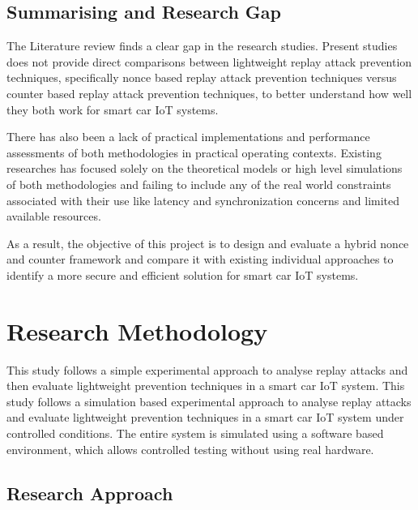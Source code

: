 \documentclass[a4paper,man,12pt]{article}
\begin{document}
\subsection{Summarising and Research Gap}

The Literature review finds a clear gap in the research studies. Present studies does not provide direct comparisons between lightweight replay attack prevention techniques, specifically nonce based replay attack prevention techniques versus counter based replay attack prevention techniques, to better understand how well they both work for smart car IoT systems.\bigbreak

There has also been a lack of practical implementations and performance assessments of both methodologies in practical operating contexts. Existing researches has focused solely on the theoretical models or high level simulations of both methodologies and failing to include any of the real world constraints associated with their use like latency and synchronization concerns and limited available resources.\bigbreak 

As a result, the objective of this project is to design and evaluate a hybrid nonce and counter framework and compare it with existing individual approaches to identify a more secure and efficient solution for smart car IoT systems.


\pagebreak
\section{Research Methodology}
\label{Methodology}

 This study follows a simple experimental approach to analyse replay attacks and then evaluate lightweight prevention techniques in a smart car IoT system. This study follows a simulation based experimental approach to analyse replay attacks and evaluate lightweight prevention techniques in a smart car IoT system under controlled conditions. The entire system is simulated using a software based environment, which allows controlled testing without using real hardware.

\subsection{Research Approach}
\end{document}
